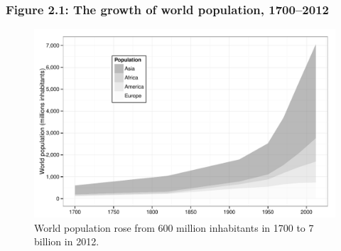 \documentclass[t]{beamer}\usepackage[]{graphicx}\usepackage[]{color}
\newenvironment{knitrout}{}{} %
\begin{document}
\begin{frame}[label=Figure_2_1b]
\frametitle{Figure 2.1: The growth of world population, 1700--2012}
\begin{figure}[t]
\begin{minipage}[b]{\textwidth}
\centering
\begin{knitrout}\footnotesize
{}\color{fgcolor}

{\centering \includegraphics[width=1\linewidth]{figures/bw/Figure_2_1b} 

}



\end{knitrout}
\caption{World population rose from 600 million inhabitants in 1700 to 7 billion in 2012.}
\end{minipage}
\end{figure}
\end{frame}
\end{document}
